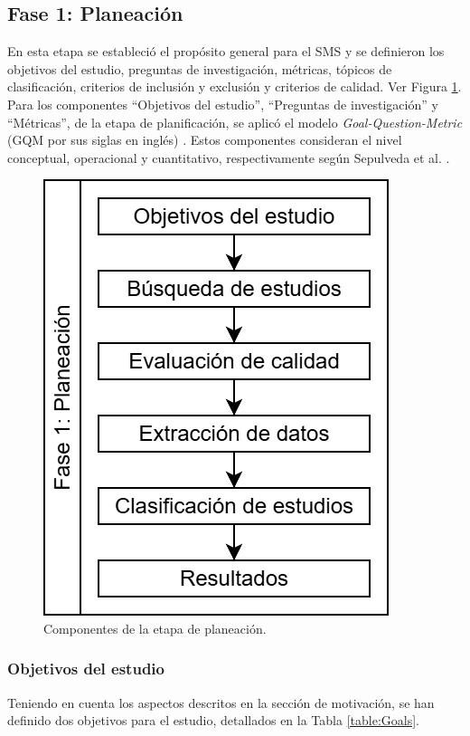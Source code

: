 \subsection{Fase 1: Planeación}\label{sec:planeacion}
En esta etapa se estableció el propósito general para el SMS y se definieron los objetivos del estudio, preguntas de investigación, métricas, tópicos de clasificación, criterios de inclusión y exclusión y criterios de calidad. Ver Figura \ref{fig:PlanningStageOverview}.
Para los componentes ``Objetivos del estudio'', ``Preguntas de investigación'' y ``Métricas'', de la etapa de planificación, se aplicó el modelo {\itshape Goal-Question-Metric} (GQM por sus siglas en inglés) \cite{basili1992software, caldiera1994goal}. Estos componentes consideran el nivel conceptual, operacional y cuantitativo, respectivamente según Sepulveda et al. \cite{Sepúlveda202141}.

\begin{figure}[htbp]
	\centering
	\includegraphics[scale=0.4]{resources/figures/sms-Etapa-1 overview.drawio.png}
	\caption{Componentes de la etapa de planeación.}
	\label{fig:PlanningStageOverview}
\end{figure}

\subsubsection{Objetivos del estudio}
Teniendo en cuenta los aspectos descritos en la sección de motivación, se han definido dos objetivos para el estudio, detallados en la Tabla \ref{table:Goals}.


